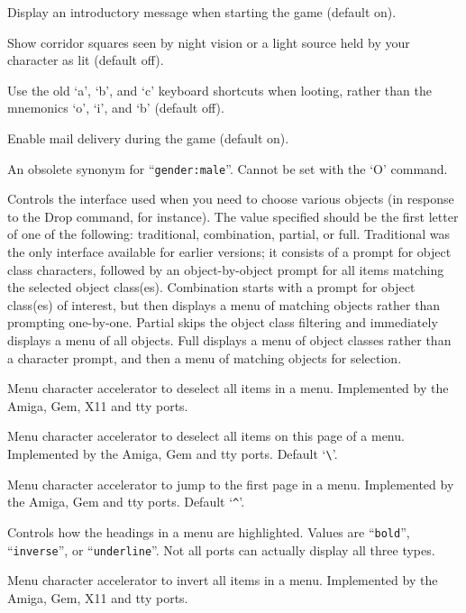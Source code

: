 \item[\tb{legacy}]
Display an introductory message when starting the game (default on).
\item[\tb{lit\_corridor}]
Show corridor squares seen by night vision or a light source held by your
character as lit (default off).
\item[\tb{lootabc}]
Use the old `a', `b', and `c' keyboard shortcuts when
looting, rather than the mnemonics `o', `i', and `b' (default off).
\item[\tb{``mail    ''}]
Enable mail delivery during the game (default on).
\item[\tb{``male    ''}]
An obsolete synonym for ``{\tt gender:male}''.
Cannot be set with the `O' command.
\item[\tb{menustyle}]
Controls the interface used when you need to choose various objects (in
response to the Drop command, for instance).  The value specified should
be the first letter of one of the following:  traditional, combination,
partial, or full.  Traditional was the only interface available for
earlier versions; it consists of a prompt for object class characters,
followed by an object-by-object prompt for all items matching the selected
object class(es).  Combination starts with a prompt for object class(es)
of interest, but then displays a menu of matching objects rather than
prompting one-by-one.  Partial skips the object class filtering and
immediately displays a menu of all objects.  Full displays a menu of
object classes rather than a character prompt, and then a menu of matching
objects for selection.
\item[\tb{menu\_deselect\_all}]
Menu character accelerator to deselect all items in a menu.
Implemented by the Amiga, Gem, X11 and tty ports.
\item[\ib{menu\_deselect\_page}]
Menu character accelerator to deselect all items on this page of a menu.
Implemented by the Amiga, Gem and tty ports.
Default `\verb+\+'.
\item[\ib{menu\_first\_page}]
Menu character accelerator to jump to the first page in a menu.
Implemented by the Amiga, Gem and tty ports.
Default `\verb+^+'.
\item[\ib{menu\_headings}]
Controls how the headings in a menu are highlighted.
Values are ``{\tt bold}'', ``{\tt inverse}'', or ``{\tt underline}''.
Not all ports can actually display all three types.
\item[\ib{menu\_invert\_all}]
Menu character accelerator to invert all items in a menu.
Implemented by the Amiga, Gem, X11 and tty ports. 
